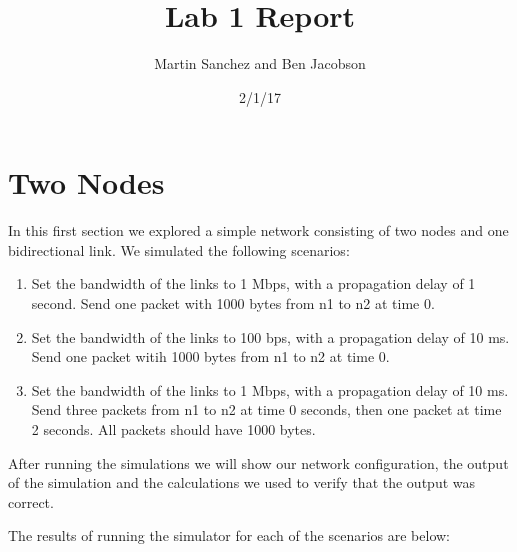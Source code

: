 \documentclass[fleqn,11pt]{article}
\begin{document}
\lstset{
  language=Python,
  basicstyle=\small,          %
  keywordstyle=\bfseries,
  identifierstyle=,           %
  commentstyle=,              %
  stringstyle=\ttfamily,      %
  showstringspaces=false,     %
  numbers=left,
  numberstyle=\tiny,
  numbersep=5pt,
  frame=tb,
}

\title{Lab 1 Report}

\author{Martin Sanchez and Ben Jacobson}

\date{2/1/17}

\maketitle

\section{Two Nodes}

In this first section we explored a simple network consisting of two nodes and one bidirectional link. We simulated the following scenarios:
\begin{enumerate}

\item Set the bandwidth of the links to 1 Mbps, with a propagation delay of 1 second. Send one packet with 1000 bytes from n1 to n2 at time 0.

\item Set the bandwidth of the links to 100 bps, with a propagation delay of 10 ms. Send one packet witih 1000 bytes from n1 to n2 at time 0.

\item Set the bandwidth of the links to 1 Mbps, with a propagation delay of 10 ms. Send three packets from n1 to n2 at time 0 seconds, then one packet at time 2 seconds. All packets should have 1000 bytes.

\end{enumerate}
After running the simulations we will show our network configuration, the output of the simulation and the calculations we used to verify that the output was correct. 

The results of running the simulator for each of the scenarios are below:
\end{document}
